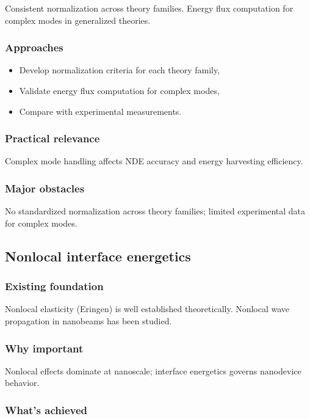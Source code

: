 Consistent normalization across theory families. Energy flux computation for complex modes in generalized theories.

\subsubsection{Approaches}

\begin{itemize}
\item Develop normalization criteria for each theory family,
\item Validate energy flux computation for complex modes,
\item Compare with experimental measurements.
\end{itemize}

\subsubsection{Practical relevance}

Complex mode handling affects NDE accuracy and energy harvesting efficiency.

\subsubsection{Major obstacles}

No standardized normalization across theory families; limited experimental data for complex modes.

\subsection{Nonlocal interface energetics}
\label{sec:15.6}

\subsubsection{Existing foundation}

Nonlocal elasticity (Eringen) is well established theoretically. Nonlocal wave propagation in nanobeams has been studied.

\subsubsection{Why important}

Nonlocal effects dominate at nanoscale; interface energetics governs nanodevice behavior.

\subsubsection{What's achieved}

